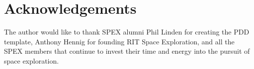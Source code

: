 \documentclass[conference]{IEEEtran} %
\begin{document}
\section*{Acknowledgements}
The author would like to thank SPEX alumni Phil Linden for creating the PDD template, Anthony Hennig for founding RIT Space Exploration, and all the SPEX members that continue to invest their time and energy into the pursuit of space exploration.




\onecolumn
\appendices{}
\end{document}
